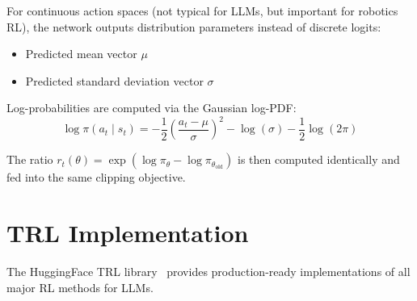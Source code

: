 For continuous action spaces (not typical for LLMs, but important for robotics RL), the network outputs distribution parameters instead of discrete logits:

\begin{itemize}
  \item Predicted mean vector $\mu$
  \item Predicted standard deviation vector $\sigma$
\end{itemize}

Log-probabilities are computed via the Gaussian log-PDF: 
\begin{equation}
\boxed{\log \pi(a_t \mid s_t) = -\frac{1}{2}\left(\frac{a_t - \mu}{\sigma}\right)^{\!2} - \log(\sigma) - \frac{1}{2}\log(2\pi)}
\end{equation}

The ratio $r_t(\theta) = \exp(\log \pi_\theta - \log \pi_{\theta_{\text{old}}})$ is then computed identically and fed into the same clipping objective.

\section{TRL Implementation}
\label{trl-implementation}

The HuggingFace TRL library~\cite{vonwerra2022trl} provides production-ready implementations of all major RL methods for LLMs.


